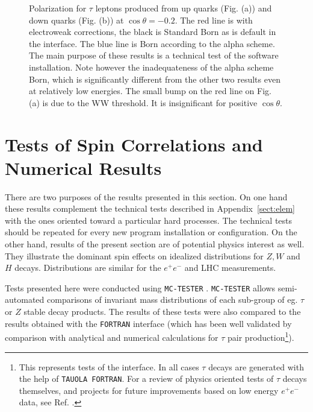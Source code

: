 \documentclass[]{Tauola_interface_design}
\begin{document}
\begin{figure}[h!]
{\label{fig:polDown}
}
\caption{ Polarization for $\tau$ leptons produced from up quarks
  (Fig. (a)) and down quarks (Fig. (b)) at $\cos\theta=-0.2$.  The red
  line is with electroweak corrections, the black is Standard Born as
  is default in the interface. The blue line is Born according to
  the alpha scheme.  The main purpose of these results is a technical test
  of the software installation.  Note however the inadequateness of the alpha
  scheme Born, which is significantly different from the other two
  results even at relatively low energies. The small bump on the red
  line on Fig. (a) is due to the WW threshold. It is insignificant for
  positive $\cos\theta$.  }
\end{figure}

\section{Tests  of Spin Correlations and Numerical Results}

There are two purposes of the results presented in this section. On
one hand these results complement the technical tests described in
Appendix~\ref{sect:elem} with the ones oriented toward a particular
hard processes.  The technical tests should be repeated for every new
program installation or configuration. On the other hand, results of
the present section are of potential physics interest as well. They
illustrate the dominant spin effects on idealized distributions for $Z,W$ and $H$ decays. Distributions are similar for the $e^+e^-$ and LHC
measurements.



\label{sec:results}

Tests presented here
were conducted using {\tt MC-TESTER} \cite{Golonka:2002rz,Davidson:2008ma}. 
{\tt MC-TESTER} allows semi-automated comparisons of invariant mass 
distributions of each sub-group of eg. $\tau$ or $Z$ stable decay products.  
The results of these tests were also compared to the 
 results obtained  with  the {\tt FORTRAN}  interface (which 
has been well validated by comparison with analytical and numerical
calculations for $\tau$ pair production\footnote{This represents
tests of the interface. In all cases $\tau$ decays are generated 
with the help of {\tt TAUOLA FORTRAN}.
For a review of physics oriented tests of $\tau$ decays themselves, and 
projects for future improvements based on low energy $e^+e^-$ data, 
see Ref. \cite{Actis:2010gg}.}). 
\end{document}
